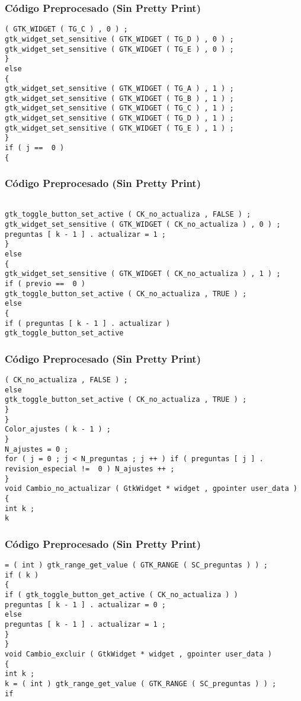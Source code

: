 \documentclass{beamer}
\begin{document}
\begin{frame}[fragile]
\frametitle{C\'odigo Preprocesado (Sin Pretty Print)}
\begin{lstlisting}[style=CStyle]
( GTK_WIDGET ( TG_C ) , 0 ) ; 
gtk_widget_set_sensitive ( GTK_WIDGET ( TG_D ) , 0 ) ; 
gtk_widget_set_sensitive ( GTK_WIDGET ( TG_E ) , 0 ) ; 
} 
else 
{ 
gtk_widget_set_sensitive ( GTK_WIDGET ( TG_A ) , 1 ) ; 
gtk_widget_set_sensitive ( GTK_WIDGET ( TG_B ) , 1 ) ; 
gtk_widget_set_sensitive ( GTK_WIDGET ( TG_C ) , 1 ) ; 
gtk_widget_set_sensitive ( GTK_WIDGET ( TG_D ) , 1 ) ; 
gtk_widget_set_sensitive ( GTK_WIDGET ( TG_E ) , 1 ) ; 
} 
if ( j ==  0 ) 
{ \end{lstlisting}
\end{frame}
\begin{frame}[fragile]
\frametitle{C\'odigo Preprocesado (Sin Pretty Print)}
\begin{lstlisting}[style=CStyle]

gtk_toggle_button_set_active ( CK_no_actualiza , FALSE ) ; 
gtk_widget_set_sensitive ( GTK_WIDGET ( CK_no_actualiza ) , 0 ) ; 
preguntas [ k - 1 ] . actualizar = 1 ; 
} 
else 
{ 
gtk_widget_set_sensitive ( GTK_WIDGET ( CK_no_actualiza ) , 1 ) ; 
if ( previo ==  0 ) 
gtk_toggle_button_set_active ( CK_no_actualiza , TRUE ) ; 
else 
{ 
if ( preguntas [ k - 1 ] . actualizar ) 
gtk_toggle_button_set_active \end{lstlisting}
\end{frame}
\begin{frame}[fragile]
\frametitle{C\'odigo Preprocesado (Sin Pretty Print)}
\begin{lstlisting}[style=CStyle]
( CK_no_actualiza , FALSE ) ; 
else 
gtk_toggle_button_set_active ( CK_no_actualiza , TRUE ) ; 
} 
} 
Color_ajustes ( k - 1 ) ; 
} 
N_ajustes = 0 ; 
for ( j = 0 ; j < N_preguntas ; j ++ ) if ( preguntas [ j ] . revision_especial !=  0 ) N_ajustes ++ ; 
} 
void Cambio_no_actualizar ( GtkWidget * widget , gpointer user_data ) 
{ 
int k ; 
k \end{lstlisting}
\end{frame}
\begin{frame}[fragile]
\frametitle{C\'odigo Preprocesado (Sin Pretty Print)}
\begin{lstlisting}[style=CStyle]
= ( int ) gtk_range_get_value ( GTK_RANGE ( SC_preguntas ) ) ; 
if ( k ) 
{ 
if ( gtk_toggle_button_get_active ( CK_no_actualiza ) ) 
preguntas [ k - 1 ] . actualizar = 0 ; 
else 
preguntas [ k - 1 ] . actualizar = 1 ; 
} 
} 
void Cambio_excluir ( GtkWidget * widget , gpointer user_data ) 
{ 
int k ; 
k = ( int ) gtk_range_get_value ( GTK_RANGE ( SC_preguntas ) ) ; 
if \end{lstlisting}
\end{frame}
\end{document}
